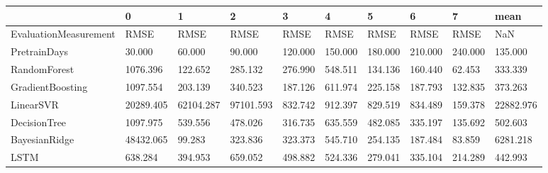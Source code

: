 \begin{tabular}{llllllllll}
\toprule
{} &         0 &         1 &         2 &       3 &       4 &       5 &       6 &       7 &      mean \\
\midrule
EvaluationMeasurement &      RMSE &      RMSE &      RMSE &    RMSE &    RMSE &    RMSE &    RMSE &    RMSE &       NaN \\
PretrainDays          &    30.000 &    60.000 &    90.000 & 120.000 & 150.000 & 180.000 & 210.000 & 240.000 &   135.000 \\
RandomForest          &  1076.396 &   122.652 &   285.132 & 276.990 & 548.511 & 134.136 & 160.440 &  62.453 &   333.339 \\
GradientBoosting      &  1097.554 &   203.139 &   340.523 & 187.126 & 611.974 & 225.158 & 187.793 & 132.835 &   373.263 \\
LinearSVR             & 20289.405 & 62104.287 & 97101.593 & 832.742 & 912.397 & 829.519 & 834.489 & 159.378 & 22882.976 \\
DecisionTree          &  1097.975 &   539.556 &   478.026 & 316.735 & 635.559 & 482.085 & 335.197 & 135.692 &   502.603 \\
BayesianRidge         & 48432.065 &    99.283 &   323.836 & 323.373 & 545.710 & 254.135 & 187.484 &  83.859 &  6281.218 \\
LSTM                  &   638.284 &   394.953 &   659.052 & 498.882 & 524.336 & 279.041 & 335.104 & 214.289 &   442.993 \\
\bottomrule
\end{tabular}
